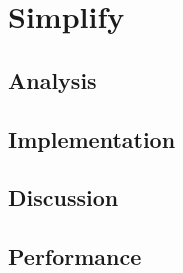 \section{Simplify}
\subsection{Analysis} %
\subsection{Implementation} %
\subsection{Discussion} %
\subsection{Performance} %

